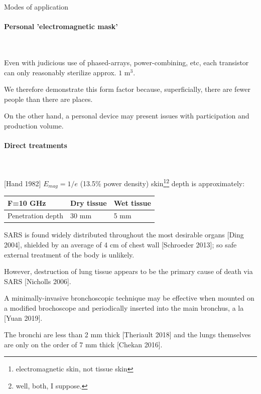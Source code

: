 \documentclass[fleqn,10pt]{article}
\begin{document}
\clearpage
\begin{multicols}{1}
{\Large Modes of application}\\

\paragraph{\textbf{Personal 'electromagnetic mask'}}\

Even with judicious use of phased-arrays, power-combining, etc, each transistor can only reasonably sterilize approx. $ 1 \text{ m}^3 $.

We therefore demonstrate this form factor because, superficially, there are fewer people than there are places. 

On the other hand, a personal device may present issues with participation and production volume.

\paragraph{\textbf{Direct treatments}}\

[Hand 1982] $E_{mag}=1/e$ (13.5\% power density) skin\footnote{electromagnetic skin, not tissue skin}\footnote{well, both, I suppose.} depth is approximately:

\begin{center}
\begin{tabular}{|l|l|l|}
\hline
F=10 GHz          & Dry tissue & Wet tissue \\ \hline
Penetration depth & 30 mm      & 5 mm \\ \hline
\end{tabular}
\end{center}

SARS is found widely distributed throughout the most desirable organs [Ding 2004], shielded by an average of 4 cm of chest wall [Schroeder 2013]; so safe external treatment of the body is unlikely. 

However, destruction of lung tissue appears to be the primary cause of death via SARS [Nicholls 2006]. 

A minimally-invasive bronchoscopic technique may be effective when mounted on a modified brochoscope and periodically inserted into the main bronchus, a la [Yuan 2019].

The bronchi are less than 2 mm thick [Theriault 2018] and the lungs themselves are only on the order of 
7 mm thick [Chekan 2016].


\end{multicols}
\end{document}
